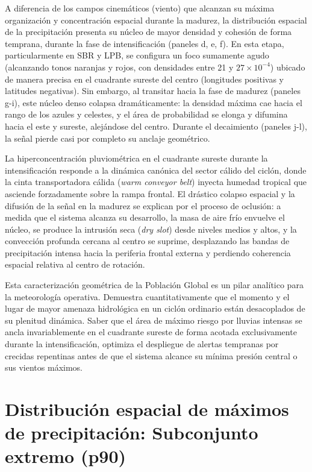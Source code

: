 A diferencia de los campos cinemáticos (viento) que alcanzan su máxima organización y concentración espacial durante la madurez, la distribución espacial de la precipitación presenta su núcleo de mayor densidad y cohesión de forma temprana, durante la fase de intensificación (paneles d, e, f). En esta etapa, particularmente en SBR y LPB, se configura un foco sumamente agudo (alcanzando tonos naranjas y rojos, con densidades entre 21 y $27 \times 10^{-4}$) ubicado de manera precisa en el cuadrante sureste del centro (longitudes positivas y latitudes negativas). Sin embargo, al transitar hacia la fase de madurez (paneles g-i), este núcleo denso colapsa dramáticamente: la densidad máxima cae hacia el rango de los azules y celestes, y el área de probabilidad se elonga y difumina hacia el este y sureste, alejándose del centro. Durante el decaimiento (paneles j-l), la señal pierde casi por completo su anclaje geométrico.

La hiperconcentración pluviométrica en el cuadrante sureste durante la intensificación responde a la dinámica canónica del sector cálido del ciclón, donde la cinta transportadora cálida (\textit{warm conveyor belt}) inyecta humedad tropical que asciende forzadamente sobre la rampa frontal. El drástico colapso espacial y la difusión de la señal en la madurez se explican por el proceso de oclusión: a medida que el sistema alcanza su desarrollo, la masa de aire frío envuelve el núcleo, se produce la intrusión seca (\textit{dry slot}) desde niveles medios y altos, y la convección profunda cercana al centro se suprime, desplazando las bandas de precipitación intensa hacia la periferia frontal externa y perdiendo coherencia espacial relativa al centro de rotación. 

Esta caracterización geométrica de la Población Global es un pilar analítico para la meteorología operativa. Demuestra cuantitativamente que el momento y el lugar de mayor amenaza hidrológica en un ciclón ordinario están desacoplados de su plenitud dinámica. Saber que el área de máximo riesgo por lluvias intensas se ancla invariablemente en el cuadrante sureste de forma acotada exclusivamente durante la intensificación, optimiza el despliegue de alertas tempranas por crecidas repentinas antes de que el sistema alcance su mínima presión central o sus vientos máximos.

\vspace{1em}

\section{Distribución espacial de máximos de precipitación: Subconjunto extremo (p90)}\label{sec:kde_espacial_tp_p90}

